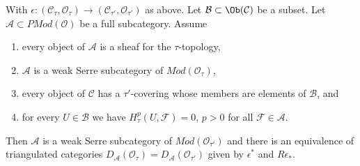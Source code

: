 \begin{lemma}
\label{lemma-compare-topologies-derived-adequate-modules}
With $\epsilon : (\mathcal{C}_\tau, \mathcal{O}_\tau) \to
(\mathcal{C}_{\tau'}, \mathcal{O}_{\tau'})$ as above.
Let $\mathcal{B} \subset \Ob(\mathcal{C})$ be a subset.
Let $\mathcal{A} \subset \textit{PMod}(\mathcal{O})$
be a full subcategory. Assume
\begin{enumerate}
\item every object of $\mathcal{A}$ is a sheaf for the $\tau$-topology,
\item $\mathcal{A}$ is a weak Serre subcategory of
$\textit{Mod}(\mathcal{O}_\tau)$,
\item every object of $\mathcal{C}$ has a $\tau'$-covering whose
members are elements of $\mathcal{B}$, and
\item for every $U \in \mathcal{B}$ we have $H^p_\tau(U, \mathcal{F}) = 0$,
$p > 0$ for all $\mathcal{F} \in \mathcal{A}$.
\end{enumerate}
Then $\mathcal{A}$ is a weak Serre subcategory of
$\textit{Mod}(\mathcal{O}_{\tau'})$ and there is an equivalence
of triangulated categories
$D_\mathcal{A}(\mathcal{O}_\tau) = D_\mathcal{A}(\mathcal{O}_{\tau'})$
given by $\epsilon^*$ and $R\epsilon_*$.
\end{lemma}

